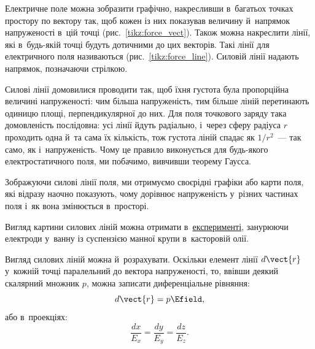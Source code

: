 Електричне поле можна зобразити графічно, накресливши в~багатьох точках простору по вектору
так, щоб кожен із них показував величину й~напрямок напруженості в~цій точці
(рис.~\ref{tikz:force_vect}). Також можна накреслити лінії, які в~будь-якій точці будуть
дотичними до цих векторів. Такі лінії для електричного поля називаються  (рис.~\ref{tikz:force_line}). Силовій лінії надають напрямок, позначаючи
стрілкою.

Силові лінії домовилися проводити так, щоб їхня густота була пропорційна величині
напруженості: чим більша напруженість, тим більше ліній перетинають одиницю площі,
перпендикулярної до них. Для поля точкового заряду така домовленість послідовна: усі лінії
йдуть радіально, і~через сферу радіуса $r$ проходить одна й~та сама їх кількість, тож
густота ліній спадає як $1/r^2$~--- так само, як і~напруженість. Чому це правило
виконується для будь-якого електростатичного поля, ми побачимо, вивчивши теорему Гаусса.

Зображуючи силові лінії поля, ми отримуємо своєрідні графіки або карти поля, які відразу
наочно показують, чому дорівнює напруженість у~різних частинах поля і~як вона змінюється
в~просторі.

Вигляд картини силових ліній можна отримати
в~\href{https://www.youtube.com/watch?v=KDEjgCEy2LU}{експерименті}, занурюючи електроди
у~ванну із суспензією манної крупи в~касторовій олії.

Вигляд силових ліній можна й~розрахувати. Оскільки елемент лінії $d\vect{r}$ у~кожній
точці паралельний до вектора напруженості, то, ввівши деякий скалярний множник $p$, можна
записати диференціальне рівняння:
\begin{equation}
	d\vect{r} = p\Efield,
\end{equation}
або в~проекціях:
\begin{equation}\label{eq:field_lines_equation}
	\frac{dx}{E_x} = \frac{dy}{E_y} = \frac{dz}{E_z}.
\end{equation}

